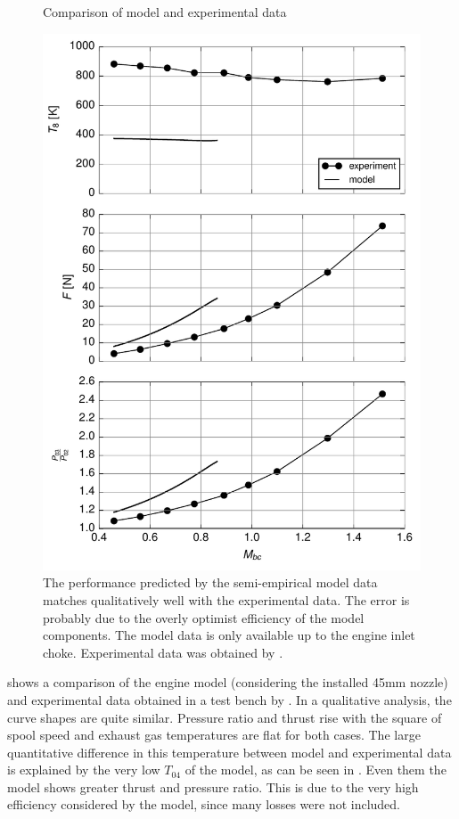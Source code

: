 \begin{figure}
    \caption{Comparison of model and experimental data}
    \label{fig:experimental}
    \includegraphics{fig/experimental}
    \source{\authorsfigure}
    \caption*{The performance predicted by the semi-empirical model data matches qualitatively well with the experimental data. The error is probably due to the overly optimist efficiency of the model components. The model data is only available up to the engine inlet choke. Experimental data was obtained by \textcite{bolsoni_test}.}
\end{figure}

 shows a comparison of the engine model (considering the installed 45mm nozzle) and experimental data obtained in a test bench by \textcite{bolsoni_test}. In a qualitative analysis, the curve shapes are quite similar. Pressure ratio and thrust rise with the square of spool speed and exhaust gas temperatures are flat for both cases. The large quantitative difference in this temperature between model and experimental data is explained by the very low $T_{04}$ of the model, as can be seen in . Even them the model shows greater thrust and pressure ratio. This is due to the very high efficiency considered by the model, since many losses were not included.

